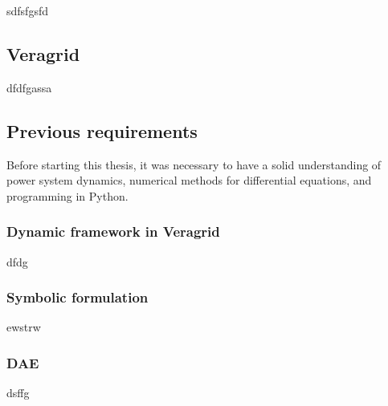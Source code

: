 sdfsfgsfd

\subsection{Veragrid}

dfdfgassa

\subsection{Previous requirements}

Before starting this thesis, it was necessary to have a solid understanding of power system dynamics, numerical methods for differential equations,
 and programming in Python.

\subsubsection{Dynamic framework in Veragrid}

dfdg

\subsubsection{Symbolic formulation}

ewstrw

\subsubsection{DAE}

dsffg

\newpage